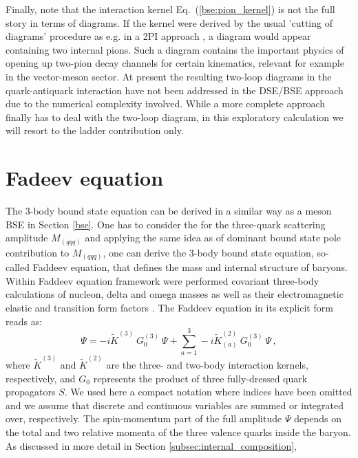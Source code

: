 Finally, note that the interaction kernel Eq.~(\ref{bse:pion_kernel}) is not the 
full story in terms of diagrams. If the kernel were derived by the usual 
'cutting of diagrams' procedure as e.g. in a 2PI approach \cite{Munczek:1994zz}, 
a diagram would appear containing two internal pions. Such a diagram 
contains the important physics of opening up two-pion decay channels for certain
kinematics, relevant for example in the vector-meson sector. At present the resulting 
two-loop diagrams in the quark-antiquark interaction have not been addressed in the
DSE/BSE approach due to the numerical complexity involved. While a more complete approach finally has 
to deal with the two-loop diagram, in this exploratory calculation we will 
resort to the ladder contribution only.   \\

\section{Fadeev equation}
The 3-body bound state equation can be derived in a similar way as a meson BSE in Section \ref{bse}. One has to consider the \DSE for the three-quark scattering amplitude $M_(qqq)$ and applying the same idea as of dominant bound state pole contribution to $M_(qqq)$, one can derive the 3-body bound state equation, so-called Faddeev equation, that defines the mass and internal structure of baryons. Within Faddeev equation framework were performed covariant three-body calculations of nucleon, delta and omega masses \cite{Eichmann:2009qa,Eichmann:2009en,SanchisAlepuz:2011jn} as well as their electromagnetic elastic and transition form factors \cite{Eichmann:2011vu,Eichmann:2011aa,Sanchis-Alepuz:2013iia}.
  The Faddeev equation in its explicit form reads as:
\begin{equation}\label{fad:3bBSEcompact}
\Psi = -i\widetilde{K}^{(3)}~G_0^{(3)}~\Psi + \sum_{a=1}^3 -i\widetilde{K}_{(a)}^{(2)}~G_0^{(3)}~\Psi\,,
\end{equation}
where $\widetilde{K}^{(3)}$ and $\widetilde{K}^{(2)}$ are the three- and two-body interaction kernels, respectively, and $G_0$ represents the product of three fully-dressed quark propagators $S$. We used here a compact notation where indices have been omitted and we assume that discrete and continuous variables are summed or integrated over, respectively. 
The spin-momentum part of the full amplitude $\Psi$ depends on 
the total and two relative momenta of the three valence quarks inside 
the baryon. As discussed in more detail in Section \ref{subsec:internal_composition}, 
